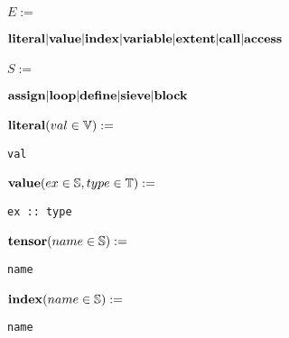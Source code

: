 \noindent\begin{minipage}{\leftwidth}
\raggedleft $E :=$~
\end{minipage}%
\begin{minipage}{\rightwidth}
$\text{\textbf{literal}} | \text{\textbf{value}} | \text{\textbf{index}} | \text{\textbf{variable}} | \text{\textbf{extent}} | \text{\textbf{call}} | \text{\textbf{access}}$
\end{minipage}

\noindent\begin{minipage}{\leftwidth}
\raggedleft $S :=$~
\end{minipage}%
\begin{minipage}{\rightwidth}
$\text{\textbf{assign}} | \text{\textbf{loop}} | \text{\textbf{define}} | \text{\textbf{sieve}} | \text{\textbf{block}}$
\end{minipage}

\noindent\begin{minipage}{\leftwidth}
\raggedleft $\text{\textbf{literal}}(val \in \mathbb{V}) :=$~
\end{minipage}%
\begin{minipage}{\rightwidth}
\begin{verbatim}
val
\end{verbatim}
\end{minipage}

\noindent\begin{minipage}{\leftwidth}
\raggedleft $\text{\textbf{value}}(ex \in \mathbb{S}, type \in \mathbb{T}) :=$~
\end{minipage}%
\begin{minipage}{\rightwidth}
\begin{verbatim}
ex :: type
\end{verbatim}
\end{minipage}

\noindent\begin{minipage}{\leftwidth}
\raggedleft $\text{\textbf{tensor}}(name \in \mathbb{S}) :=$~
\end{minipage}%
\begin{minipage}{\rightwidth}
\begin{verbatim}
name
\end{verbatim}
\end{minipage}

\noindent\begin{minipage}{\leftwidth}
\raggedleft $\text{\textbf{index}}(name \in \mathbb{S}) :=$~
\end{minipage}%
\begin{minipage}{\rightwidth}
\begin{verbatim}
name
\end{verbatim}
\end{minipage}

